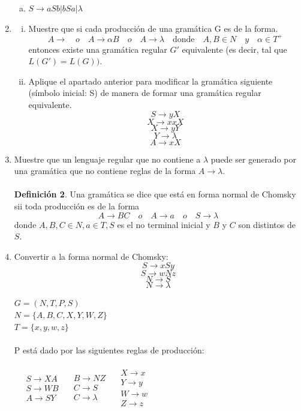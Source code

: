 \documentclass{article}
\begin{document}
\begin{enumerate}[1.]
    \begin{enumerate}[a)]
      \item
        $S \rightarrow aSb | bSa | \lambda$
    \end{enumerate} 
  \item
    \begin{enumerate}[i.]
      \item
        Muestre que si cada producción de una gramática G es de la forma.
        \[ A \rightarrow \quad o \quad A \rightarrow \alpha B \quad o \quad A \rightarrow \lambda \quad \text{donde} 
        \quad A,B \in N \quad y \quad \alpha \in T^{+} \]
        entonces existe una gramática regular $G'$ equivalente (es decir, tal que $L(G') = L(G))$.
      \item
        Aplique el apartado anterior para modificar la gramática siguiente (símbolo inicial: S) de manera de formar
        una gramática regular equivalente.
        \[ S \rightarrow yX \]
        \[ X \rightarrow xxX \]
        \[ X \rightarrow yY \]
        \[ Y \rightarrow \lambda \]
        \[ A \rightarrow xX \]
    \end{enumerate}
  \item
    Muestre que un lenguaje regular que no contiene a $\lambda$ puede ser generado por una gramática que no contiene
    reglas de la forma $A \rightarrow \lambda$. \\ \\
    \textbf{Definición 2}. Una gramática se dice que está en forma normal de Chomsky sii toda producción es de la forma
    \[ A \rightarrow BC \quad o \quad A \rightarrow a \quad o \quad S \rightarrow \lambda \]
    donde $A,B,C \in N, a \in T, S$ es el no terminal inicial y $B$ y $C$ son distintos de $S$.
  \item
    Convertir a la forma normal de Chomsky:
    \[ S \rightarrow xSy \]
    \[ S \rightarrow wNz \]
    \[ N \rightarrow S\]
    \[ N \rightarrow \lambda \]

    $G = (N,T,P,S)$ \\
    $N = \{ A,B,C,X,Y,W,Z \}$ \\
    $T = \{ x,y,w,z \}$ \\ \\
    P está dado por las siguientes reglas de producción: \\ \\
    $\quad \begin{array}{lcl}
      S \rightarrow XA\\
      S \rightarrow WB \\
      A \rightarrow SY
     \end{array} \quad
    \begin{array}{lcl}
      B \rightarrow NZ \\
      C \rightarrow S \\
      C \rightarrow \lambda
    \end{array} \quad
    \begin{array}{lcl}
      X \rightarrow x \\
      Y \rightarrow y \\
      W \rightarrow w \\
      Z \rightarrow z
    \end{array}$
\end{enumerate}
\end{document}
